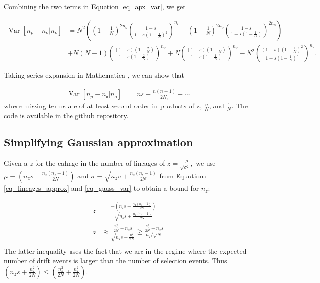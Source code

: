 \documentclass[review]{elsarticle}
\begin{document}
Combining the two terms in Equation \eqref{eq_apx_var}, we get

\newcommand{\vara}[1]{\left(1-\frac{#1}{N}\right)}
\newcommand{\varb}[1]{\left(\frac{1-s}{1-s #1}\right)}

\begin{equation}
  \begin{aligned}
    \operatorname{Var}[n_p-n_o | n_o] &=
    N^2\left( \vara{1}^{2n_o}\varb{\vara{1}^2}^{n_o}-\vara{1}^{2n_o}\varb{\vara{1}}^{2n_o} \right) + \\
    &+ N (N-1) \left( \frac{ (1-s)\left( 1-\frac{2}{N} \right) }{ 1-s\left( 1-\frac{2}{N} \right) } \right)^{n_o} + N \left( \frac{(1-s)\left( 1-\frac{1}{N} \right)}{1-s\left( 1-\frac{1}{N} \right)}\right)^{n_o} - N^2 \left( \frac{(1-s)\left( 1-\frac{1}{N} \right)^2}{1-s\left( 1-\frac{1}{N} \right)^2}\right)^{n_o}.
    \label{eq_exact_var}
  \end{aligned}
\end{equation}

Taking series expansion in Mathematica \citep{Mathematica}, we can show that

\begin{equation}
  \begin{aligned}
    \operatorname{Var}[n_p-n_o | n_o] &= n s + \frac{n (n-1)}{2 N_e}  + \cdots
    \label{eq_exact_var}
  \end{aligned}
\end{equation}
where missing terms are of at least second order in products of  $s$, $\frac{n}{N}$,  and
$\frac{1}{N}.$ The code is available in the github repository.

\subsection{Simplifying Gaussian approximation}
\label{subsec_apx_gauss}
Given a $z$ for the cahnge in the number of lineages of $ z = \frac{-\mu}{\sqrt{\sigma^2}},$ 
we use $\mu=\left(  n_zs - \frac{n_z(n_z-1)}{2N} \right)$ and $\sigma = \sqrt{n_zs +
\frac{n_z(n_z-1)}{2N}}$ from Equations \ref{eq_lineages_approx} and \ref{eq_gauss_var} to obtain a bound for $n_z$: 


\begin{equation}
\begin{aligned}
  z &= \frac{-\left(  n_zs - \frac{n_z(n_z-1)}{2N} \right)}	{\sqrt{n_zs + \frac{n_z(n_z-1)}{2N}}} \\
  z &\approx \frac{\frac{n_z^2}{2N} - n_z s}	{\sqrt{n_zs + \frac{n_z^2}{2N}}} \geq \frac{\frac{n_z^2}{2N} - n_z s}{n_z / \sqrt{N}} \\
 \end{aligned}
\end{equation}
 The latter inequality uses the fact that we are in the regime where the expected number of drift events is larger than the number of 
 selection events. Thus $\left(n_zs +
\frac{n_z^2}{2N} \right) \leq \left(\frac{n_z^2}{2N} + \frac{n_z^2}{2N} \right)$.
 
\end{document}
